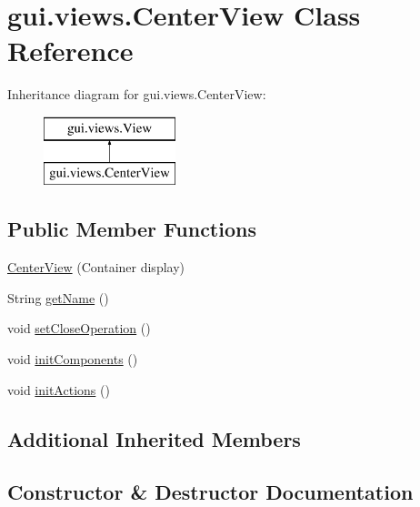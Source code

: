 \hypertarget{classgui_1_1views_1_1_center_view}{}\section{gui.\+views.\+Center\+View Class Reference}
\label{classgui_1_1views_1_1_center_view}
Inheritance diagram for gui.\+views.\+Center\+View\+:\begin{figure}[H]
\begin{center}
\leavevmode
\includegraphics[height=2.000000cm]{classgui_1_1views_1_1_center_view}
\end{center}
\end{figure}
\subsection*{Public Member Functions}
\begin{DoxyCompactItemize}
\item 
\mbox{\hyperlink{classgui_1_1views_1_1_center_view_ab80e2efee3a410e5ccfc8ca285a81554}{Center\+View}} (Container display)
\item 
String \mbox{\hyperlink{classgui_1_1views_1_1_center_view_a9137970d5f143813a78b78d63316f9c3}{get\+Name}} ()
\item 
void \mbox{\hyperlink{classgui_1_1views_1_1_center_view_ae7ef58a077715b2730fca4ca104f420f}{set\+Close\+Operation}} ()
\item 
void \mbox{\hyperlink{classgui_1_1views_1_1_center_view_a88ac8cd9a5762534aa61168112bd8052}{init\+Components}} ()
\item 
void \mbox{\hyperlink{classgui_1_1views_1_1_center_view_acfa598e297fc3ef6a2649d4a188f5da4}{init\+Actions}} ()
\end{DoxyCompactItemize}
\subsection*{Additional Inherited Members}


\subsection{Constructor \& Destructor Documentation}
\mbox{\label{classgui_1_1views_1_1_center_view_ab80e2efee3a410e5ccfc8ca285a81554}} 
